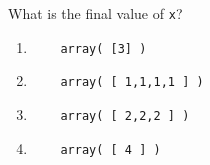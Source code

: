 \documentclass[12pt]{article}
\begin{document}
  What is the final value of \texttt{x}?
  
  \begin{enumerate}[label=\Alph*]
  	\item
  	\begin{Verbatim}
  	array( [3] )
  	\end{Verbatim}
  	\item
  	\begin{Verbatim}
  	array( [ 1,1,1,1 ] )
  	\end{Verbatim}
  	\item
  	\begin{Verbatim}
  	array( [ 2,2,2 ] )
  	\end{Verbatim}
  	\item
  	\begin{Verbatim}
  	array( [ 4 ] )
  	\end{Verbatim}
  \end{enumerate}
\end{document}
